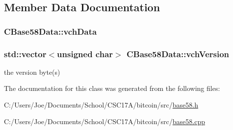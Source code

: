 \subsection{Member Data Documentation}
\hypertarget{class_c_base58_data_ae7ef7dfb93683aa4aaee8b74da5abb9c}{}
\subsubsection[{vch\+Data}]{ C\+Base58\+Data\+::vch\+Data\hspace{0.3cm}{\ttfamily [protected]}}\label{class_c_base58_data_ae7ef7dfb93683aa4aaee8b74da5abb9c}
\hypertarget{class_c_base58_data_a110c1008f399053098a1bdf63408e923}{}
\subsubsection[{vch\+Version}]{\setlength{\rightskip}{0pt plus 5cm}std\+::vector$<$unsigned char$>$ C\+Base58\+Data\+::vch\+Version\hspace{0.3cm}{\ttfamily [protected]}}\label{class_c_base58_data_a110c1008f399053098a1bdf63408e923}


the version byte(s) 



The documentation for this class was generated from the following files\+:\begin{DoxyCompactItemize}
\item 
C\+:/\+Users/\+Joe/\+Documents/\+School/\+C\+S\+C17\+A/bitcoin/src/\hyperlink{base58_8h}{base58.\+h}\item 
C\+:/\+Users/\+Joe/\+Documents/\+School/\+C\+S\+C17\+A/bitcoin/src/\hyperlink{base58_8cpp}{base58.\+cpp}\end{DoxyCompactItemize}
